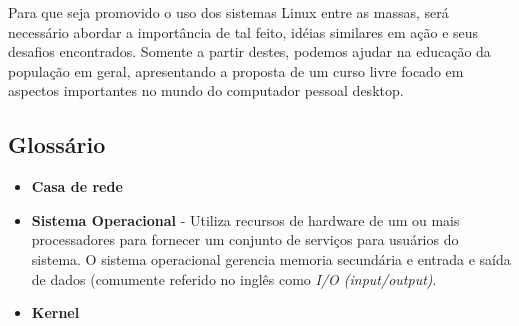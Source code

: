 \documentclass{article}
\begin{document}
Para que seja promovido o uso dos sistemas Linux entre as massas, será necessário abordar a importância de tal feito, idéias similares em ação e seus desafios encontrados. Somente a partir destes, podemos ajudar na educação da população em geral, apresentando a proposta de um curso livre focado em aspectos importantes no mundo do computador pessoal desktop.

\subsection{Glossário}

\begin{itemize}
\item \textbf{Casa de rede}
\item \textbf{Sistema Operacional} - Utiliza recursos de hardware de um ou mais processadores para fornecer um conjunto de serviços para usuários do sistema. O sistema operacional gerencia memoria secundária e entrada e saída de dados (comumente referido no inglês como \textit{I/O (input/output)}.
\item \textbf{Kernel}
\end{itemize}
\end{document}
